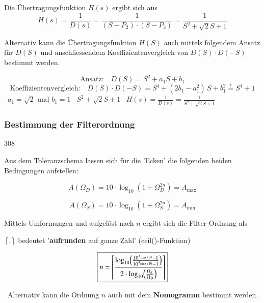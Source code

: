 \vspace{0.2cm}
Die Übertragungsfunktion $H(s)$ ergibt sich aus
$$ H(s) = \frac{1}{D(s)} = \frac{1}{(S - P_2) \cdot (S - P_3)} = \frac{1}{S^2 + \sqrt{2} S + 1} $$


Alternativ kann die Übertragungsfunktion $H(S)$ auch mittels folgendem Ansatz für $D(S)$ und anschliessendem Koeffizientenvergleich
von $D(S) \cdot D(-S)$ bestimmt werden.

$$ \text{Ansatz:} \quad  D(S) =  S^2 + a_1 S + b_1 $$
$$ \text{Koeffizientenvergleich:} \quad D(S) \cdot D(-S) = S^4 + (2 b_1 - a_1^2) \, S + b_1^2 \overset{!}{=} S^4 + 1 $$
\textrightarrow\ $a_1 = \sqrt{2}$ und $b_1 = 1$ \quad \textrightarrow\ $S^2 + \sqrt{2} S + 1$ 
\quad \textrightarrow\ $H(s) = \frac{1}{D(s)} = \frac{1}{S^2 + \sqrt{2} S + 1}$


\subsubsection{Bestimmung der Filterordnung}{308}

Aus dem Toleranzschema lassen sich für die 'Ecken' die folgenden beiden Bedingungen aufstellen:

\begin{minipage}[c]{0.48\columnwidth}
    $$ A(\Omega_D) = 10 \cdot \log_{10}(1 + \Omega_D^{2n}) = A_{\max} $$
\end{minipage}
\hfill
\begin{minipage}[c]{0.48\columnwidth}
    $$ A(\Omega_S) = 10 \cdot \log_{10}(1 + \Omega_S^{2n}) = A_{\min} $$
\end{minipage}

\vspace{0.2cm}
\begin{minipage}[c]{0.48\columnwidth}
    Mittels Umformungen und aufgelöst nach $n$ ergibt sich die Filter-Ordnung als 

    \medskip
    $\left\lceil . \right\rceil $ bedeutet '\textbf{aufrunden} auf ganze Zahl' (ceil()-Funktion)
\end{minipage}
\hfill
\begin{minipage}[c]{0.48\columnwidth}
    $$ \boxed{ n =  \left\lceil \frac{\log_{10} \Bigl( \frac{10^{A_{\min / 10}} - 1}{10^{A_{\max / 10}} - 1}  \Bigr) }
        {2 \cdot \log_{10}\Bigl( \frac{\Omega_S}{\Omega_D} \Bigr)}  \right\rceil } $$
\end{minipage}

\textrightarrow\ Alternativ kann die Ordnung $n$ auch mit dem \textbf{Nomogramm} bestimmt werden.

